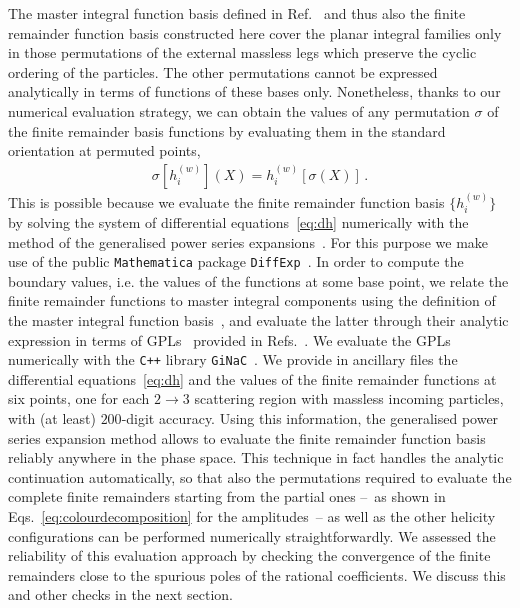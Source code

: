 \documentclass[main.tex]{subfiles}
\begin{document}
The master integral function basis defined in Ref.~\cite{Badger:2021nhg} and thus also the finite remainder function basis constructed here cover the planar integral families only in those permutations of the external massless legs which preserve the cyclic ordering of the particles. The other permutations cannot be expressed analytically in terms of functions of these bases only. Nonetheless, thanks to our numerical evaluation strategy, we can obtain the values of any permutation $\sigma$ of the finite remainder basis functions by evaluating them in the standard orientation at permuted points,
\begin{align}
\sigma \left[ h^{(w)}_i \right] (X) =  h^{(w)}_i \left[\sigma\left(X\right)\right] \,.
\end{align}
This is possible because 
we evaluate the finite remainder function basis $\{h^{(w)}_i\}$ by solving the system of differential equations~\eqref{eq:dh} numerically with the method of the generalised power series expansions~\cite{Francesco:2019yqt}. For this purpose we make use of the public \texttt{Mathematica} package \texttt{DiffExp}~\cite{Hidding:2020ytt}. In order to compute the boundary values, i.e. the values of the functions at some base point, we relate the finite remainder functions to master integral components using the definition of the master integral function basis~\cite{Badger:2021nhg}, and evaluate the latter through their analytic expression in terms of GPLs~\cite{2011arXiv1105.2076G,Remiddi:1999ew,2001math......3059G} provided in Refs.~\cite{Papadopoulos:2015jft,Syrrakos:2020kba,Canko:2020ylt}. We evaluate the GPLs numerically with the \texttt{C++} library \texttt{GiNaC}~\cite{Vollinga:2004sn}. We provide in ancillary files the differential equations~\eqref{eq:dh} and the values of the finite remainder functions at six points, one for each $2\to 3$ scattering region with massless incoming particles, with (at least) $200$-digit accuracy. Using this information, the generalised power series expansion method allows to evaluate the finite remainder function basis reliably anywhere in the phase space. This technique in fact handles the analytic continuation automatically, so that also the permutations required to evaluate the complete finite remainders starting from the partial ones --~as shown in Eqs.~\eqref{eq:colourdecomposition} for the amplitudes~-- as well as the other helicity configurations can be performed numerically straightforwardly. We assessed the reliability of this evaluation approach by checking the convergence of the finite remainders close to the spurious poles of the rational coefficients. We discuss this and other checks in the next section.
\end{document}
